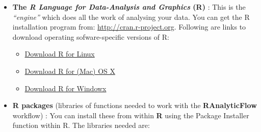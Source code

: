 \documentclass[12pt,]{book}
\theoremstyle{definition}
\theoremstyle{definition}
\theoremstyle{definition}
\theoremstyle{remark}
\begin{document}
\begin{itemize}
\item
  \textbf{The \emph{R Language for Data-Analysis and Graphics} (R)} :
  This is the \emph{``engine''} which does all the work of analysing
  your data. You can get the R installation program from:
  \url{http://cran.r-project.org}. Following are links to download
  operating sofware-specific versions of R:

  \begin{itemize}
  \item
    \href{https://cran.r-project.org/bin/linux/}{Download R for Linux}
  \item
    \href{https://cran.r-project.org/bin/macosx/}{Download R for (Mac)
    OS X}
  \item
    \href{https://cran.r-project.org/bin/windows/}{Download R for
    Windowx}
  \end{itemize}
\item
  \textbf{R packages} (libraries of functions needed to work with the
  \textbf{RAnalyticFlow} workflow) : You can install these from within
  \textbf{R} using the Package Installer function within R. The
  libraries needed are:
\end{itemize}
\end{document}
